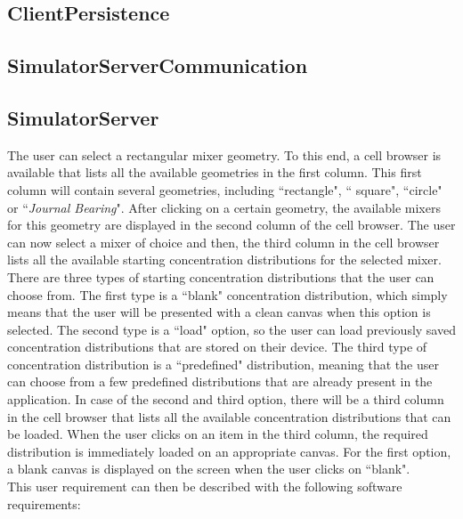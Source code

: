 \subsection{ClientPersistence}

\subsection{SimulatorServerCommunication}

\subsection{SimulatorServer}

The user can select a rectangular mixer geometry. To this end, a cell browser is available that lists all the available geometries in the first column. This first column will contain several geometries, including ``rectangle", `` square", ``circle" or ``\emph{Journal Bearing}". After clicking on a certain geometry, the available mixers for this geometry are displayed in the second column of the cell browser. The user can now select a mixer of choice and then, the third column in the cell browser lists all the available starting concentration distributions for the selected mixer. There are three types of starting concentration distributions that the user can choose from. The first type is a ``blank" concentration distribution, which simply means that the user will be presented with a clean canvas when this option is selected. The second type is a ``load" option, so the user can load previously saved concentration distributions that are stored on their device. The third type of concentration distribution is a ``predefined" distribution, meaning that the user can choose from a few predefined distributions that are already present in the application. In case of the second and third option, there will be a third column in the cell browser that lists all the available concentration distributions that can be loaded. When the user clicks on an item in the third column, the required distribution is immediately loaded on an appropriate canvas. For the first option, a blank canvas is displayed on the screen when the user clicks on ``blank". \\
This user requirement can then be described with the following software requirements:

